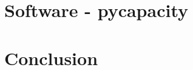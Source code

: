 \documentclass[
11pt, %
english, %
singlespacing, %
nohyperref, %
headsepline, %
]{MastersDoctoralThesis} %
\begin{document}
\chapter{Software - pycapacity}
\label{ch:software}
\chapter{Conclusion}

% 
% 
% 

\appendix %




%



\end{document}
